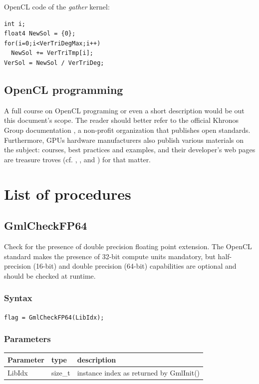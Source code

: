\documentclass[a4paper,12pt]{article}
\begin{document}
OpenCL code of the \emph{gather} kernel:
\begin{tt}
\begin{verbatim}
int i;
float4 NewSol = {0};
for(i=0;i<VerTriDegMax;i++)
  NewSol += VerTriTmp[i];
VerSol = NewSol / VerTriDeg;
\end{verbatim}
\end{tt}
\normalfont


\subsection{OpenCL programming}
A full course on OpenCL programing or even a short description would be out this document's scope. The reader should better refer to the official Khronos Group documentation \cite{khronos}, a non-profit organization that publishes open standards. Furthermore, GPUs hardware manufacturers also publish various materials on the subject: courses, best practices and examples, and their developer's web pages are treasure troves (cf. \cite{nvidia}, \cite{gpuopen}, \cite{rocm} and \cite{apple}) for that matter.


%
%

\section{List of procedures}

\subsection{GmlCheckFP64}
Check for the presence of double precision floating point extension. The OpenCL standard makes the presence of 32-bit compute units mandatory, but half-precision (16-bit) and double precision (64-bit) capabilities are optional and should be checked at runtime.

\subsubsection*{Syntax}
{\tt flag = GmlCheckFP64(LibIdx);}

\subsubsection*{Parameters}
\begin{tabular}{|m{2cm}|m{1.5cm}|m{10.5cm}|}
\hline
Parameter  & type    & description \\
\hline
LibIdx     & size\_t & instance index as returned by GmlInit() \\
\hline
\end{tabular}
\end{document}
